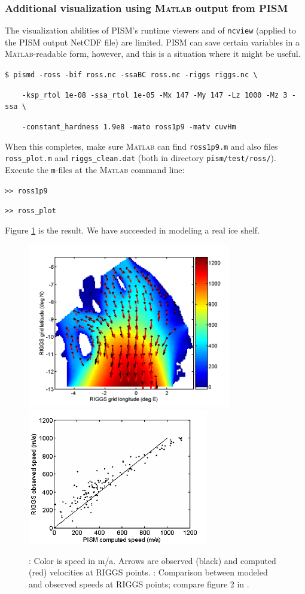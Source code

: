 \documentclass[11pt,final]{amsart}
\newcommand{\Matlab}{\textsc{Matlab}\xspace}
\begin{document}
\subsubsection*{Additional visualization using \Matlab output from PISM}  The visualization abilities of PISM's runtime viewers and of \verb|ncview| (applied to the PISM output NetCDF file) are limited.  PISM can save certain variables in a \Matlab-readable form, however, and this is a situation where it might be useful.

\verb|$ pismd -ross -bif ross.nc -ssaBC ross.nc -riggs riggs.nc \|

\verb|    -ksp_rtol 1e-08 -ssa_rtol 1e-05 -Mx 147 -My 147 -Lz 1000 -Mz 3 -ssa \|

\verb|    -constant_hardness 1.9e8 -mato ross1p9 -matv cuvHm|

\noindent When this completes, make sure \Matlab can find \verb|ross1p9.m| and also files \verb|ross_plot.m| and \verb|riggs_clean.dat| (both in directory \verb|pism/test/ross/|).  Execute the \verb|m|-files at the \Matlab command line:

\verb|>> ross1p9|

\verb|>> ross_plot|

\noindent Figure \ref{fig:rossmatlab} is the result.  We have succeeded in modeling a real ice shelf.

\begin{figure}[ht]
\mbox{\includegraphics[width=3.5in,keepaspectratio=true]{figs/rossquiver}\quad \includegraphics[width=3.1in,keepaspectratio=true]{figs/rossscatter}}
\caption{: Color is speed in m/a.  Arrows are observed (black) and computed (red) velocities at RIGGS points.  : Comparison between modeled and observed speeds at RIGGS points; compare figure 2  in \cite{MacAyealetal}.}
\label{fig:rossmatlab}
\end{figure}
\end{document}
